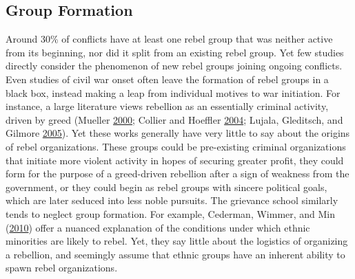 \documentclass[12pt,]{book}
\theoremstyle{definition}
\theoremstyle{definition}
\theoremstyle{remark}
\begin{document}
\subsection{Group Formation}\label{group-formation}

Around 30\% of conflicts have at least one rebel group that was neither
active from its beginning, nor did it split from an existing rebel
group. Yet few studies directly consider the phenomenon of new rebel
groups joining ongoing conflicts. Even studies of civil war onset often
leave the formation of rebel groups in a black box, instead making a
leap from individual motives to war initiation. For instance, a large
literature views rebellion as an essentially criminal activity, driven
by greed (Mueller \protect\hyperlink{ref-mueller00}{2000}; Collier and
Hoeffler \protect\hyperlink{ref-Collier2004}{2004}; Lujala, Gleditsch,
and Gilmore \protect\hyperlink{ref-Lujala2005}{2005}). Yet these works
generally have very little to say about the origins of rebel
organizations. These groups could be pre-existing criminal organizations
that initiate more violent activity in hopes of securing greater profit,
they could form for the purpose of a greed-driven rebellion after a sign
of weakness from the government, or they could begin as rebel groups
with sincere political goals, which are later seduced into less noble
pursuits. The grievance school similarly tends to neglect group
formation. For example, Cederman, Wimmer, and Min
(\protect\hyperlink{ref-Cederman2010}{2010}) offer a nuanced explanation
of the conditions under which ethnic minorities are likely to rebel.
Yet, they say little about the logistics of organizing a rebellion, and
seemingly assume that ethnic groups have an inherent ability to spawn
rebel organizations.
\end{document}
